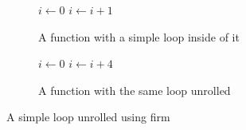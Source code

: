 \begin{figure}[h]
    \begin{subfigure}[b]{0.5\textwidth}
        \centering
        \begin{algorithmic}
                \State $i \gets 0$
                    \State {}
                    \State $i \gets i + 1$
                \EndWhile
            \EndFunction
        \end{algorithmic}
        \caption{A function with a simple loop inside of it}
    \end{subfigure}
    \begin{subfigure}[b]{0.5\textwidth}
        \centering
        \begin{algorithmic}
                \State $i \gets 0$
                    \State {}
                    \State {}
                    \State {}
                    \State {}
                    \State $i \gets i + 4$
                \EndWhile
            \EndFunction
        \end{algorithmic}
        \caption{A function with the same loop unrolled}
    \end{subfigure}
    \caption{A simple loop unrolled using firm}
    \label{fig:basics:old-loop-unrolling}
\end{figure}